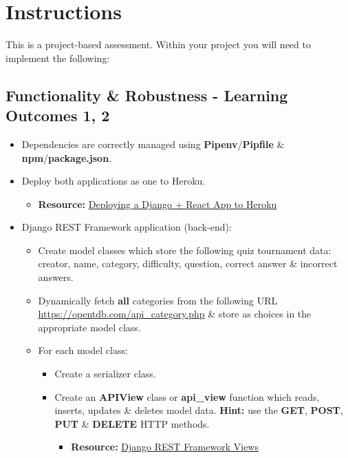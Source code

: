 \documentclass{article}
\begin{document}
\newpage

\section*{Instructions} 
This is a project-based assessment. Within your project you will need to implement the following:

\subsection*{Functionality \& Robustness - Learning Outcomes 1, 2}
\begin{itemize}
	\item Dependencies are correctly managed using \textbf{Pipenv}/\textbf{Pipfile} \& \textbf{npm}/\textbf{package.json}.
	\item Deploy both applications as one to Heroku.
	\begin{itemize}
		\item \textbf{Resource:} \href{https://librenepal.com/article/django-and-create-react-app-together-on-heroku/}{Deploying a Django + React App to Heroku}
	\end{itemize}
	\item Django REST Framework application (back-end):
	\begin{itemize}
		\item Create model classes which store the following quiz tournament data: creator, name, category, difficulty, question, correct answer \& incorrect answers. 
		\item Dynamically fetch \textbf{all} categories from the following URL \href{https://opentdb.com/api\_category.php}{https://opentdb.com/api\_category.php} \& store as choices in the appropriate model class.
		\item For each model class:
		\begin{itemize}
			\item Create a serializer class. 
			\item Create an \textbf{APIView} class or \textbf{api\_view} function which reads, inserts, updates \& deletes model data. \textbf{Hint:} use the \textbf{GET}, \textbf{POST}, \textbf{PUT} \& \textbf{DELETE} HTTP methods.
			\begin{itemize}
				\item \textbf{Resource:} \href{https://www.django-rest-framework.org/api-guide/views}{Django REST Framework Views}
			\end{itemize}
		\end{itemize} 

\end{itemize}
\end{itemize}
\end{document}
